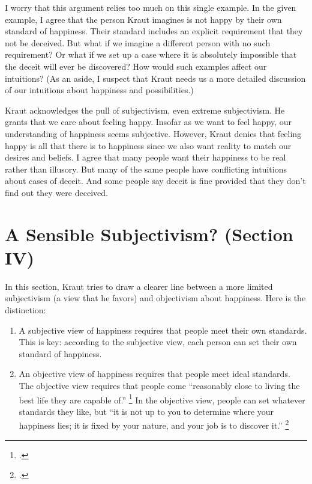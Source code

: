 \documentclass[12pt,letterpaper]{article}
\begin{document}
I worry that this argument relies too much on this single example.
In the given example, I agree that the person Kraut imagines is not happy by their own standard of happiness.
Their standard includes an explicit requirement that they not be deceived.
But what if we imagine a different person with no such requirement?
Or what if we set up a case where it is absolutely impossible that the deceit will ever be discovered?
How would such examples affect our intuitions?
(As an aside, I suspect that Kraut needs us a more detailed discussion of our intuitions about happiness and possibilities.)

Kraut acknowledges the pull of subjectivism, even extreme subjectivism.
He grants that we care about feeling happy.
Insofar as we want to feel happy, our understanding of happiness seems subjective.
However, Kraut denies that feeling happy is all that there is to happiness since we also want reality to match our desires and beliefs.
I agree that many people want their happiness to be real rather than illusory.
But many of the same people have conflicting intuitions about cases of deceit.
And some people say deceit is fine provided that they don't find out they were deceived.

\section*{A Sensible Subjectivism? (Section IV)}

In this section, Kraut tries to draw a clearer line between a more limited subjectivism (a view that he favors) and objectivism about happiness.
Here is the distinction:

\begin{enumerate}
    \item A subjective view of happiness requires that people meet their own standards.
        This is key: according to the subjective view, each person can set their own standard of happiness.
    \item An objective view of happiness requires that people meet ideal standards.
        The objective view requires that people come ``reasonably close to living the best life they are capable of.''%
        \footcite[][181]{two-conceptions-of-happiness-kraut-1979}
        In the objective view, people can set whatever standards they like, but ``it is not up to you to determine where your happiness lies; it is fixed by your nature, and your job is to discover it.''%
        \footcite[][181]{two-conceptions-of-happiness-kraut-1979}
\end{enumerate}
\end{document}
